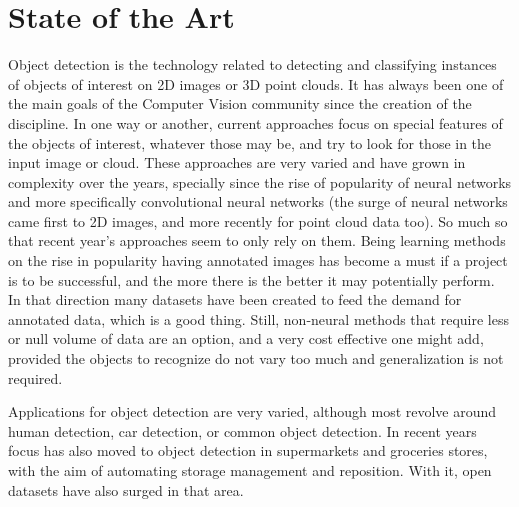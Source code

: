 \documentclass[../main.tex]{subfiles}
\begin{document}
\section{State of the Art}
Object detection is the technology related to detecting and classifying instances of objects of interest on 2D images or 3D point clouds. It has always been one of the main goals of the Computer Vision community since the creation of the discipline. In one way or another, current approaches focus on special features of the objects of interest, whatever those may be, and try to look for those in the input image or cloud. These approaches are very varied and have grown in complexity over the years, specially since the rise of popularity of neural networks and more specifically convolutional neural networks (the surge of neural networks came first to 2D images, and more recently for point cloud data too). So much so that recent year's approaches seem to only rely on them. Being learning methods on the rise in popularity having annotated images has become a must if a project is to be successful, and the more there is the better it may potentially perform. In that direction many datasets have been created to feed the demand for annotated data, which is a good thing. Still, non-neural methods that require less or null volume of data are an option, and a very cost effective one might add, provided the objects to recognize do not vary too much and generalization is not required. 

Applications for object detection are very varied, although most revolve around human detection, car detection, or common object detection. In recent years focus has also moved to object detection in supermarkets and groceries stores, with the aim of automating storage management and reposition. With it, open datasets have also surged in that area.
\end{document}
